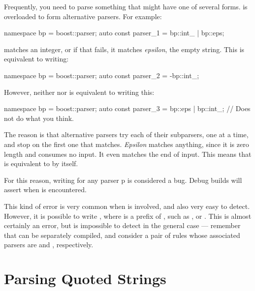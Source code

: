 \documentclass{MyBook}
\begin{document}
Frequently, you need to parse something that might have one of several forms.  is overloaded to form alternative parsers. For example:

\begin{code}
namespace bp = boost::parser;
auto const parser_1 = bp::int_ | bp::eps;
\end{code}

 matches an integer, or if that fails, it matches \emph{epsilon}, the empty string. This is equivalent to writing:

\begin{code}
namespace bp = boost::parser;
auto const parser_2 = -bp::int_;
\end{code}

However, neither  nor  is equivalent to writing this:

\begin{code}
namespace bp = boost::parser;
auto const parser_3 = bp::eps | bp::int_; // Does not do what you think.
\end{code}

The reason is that alternative parsers try each of their subparsers, one at a time, and stop on the first one that matches. \emph{Epsilon} matches anything, since it is zero length and consumes no input. It even matches the end of input. This means that  is equivalent to  by itself.

\begin{marker}[title=Note ]
For this reason, writing  for any parser p is considered a bug. Debug builds will assert when  is encountered. 
\end{marker}

\begin{marker}[title=Warning ]
This kind of error is very common when  is involved, and also very easy to detect. However, it is possible to write , where  is a prefix of , such as , or . This is almost certainly an error, but is impossible to detect in the general case --- remember that  can be separately compiled, and consider a pair of rules whose associated  parsers are  and , respectively. 
\end{marker}

\section{Parsing Quoted Strings}
\end{document}
